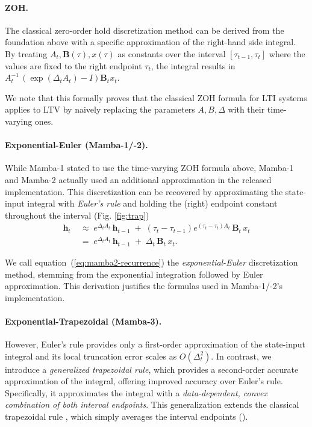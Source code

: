 \documentclass{article}
\newcommand{\citep}{\parencite}
\def\eqref#1{equation~(\ref{#1})}
\def\vh{{\bm{h}}}
\def\bB{{\bm{B}}}
\theoremstyle{plain}
\theoremstyle{definition}
\theoremstyle{remark}
\begin{document}
\paragraph{ZOH.}
The classical zero-order hold discretization method can be derived from the foundation above with a specific approximation of the right-hand side integral.
By treating $A_t, \bB(\tau), x(\tau)$ as constants over the interval $[\tau_{t-1}, \tau_t]$ where the values are fixed to the right endpoint $\tau_t$, the integral results in $A_t^{-1}\,\left(\exp(\Delta_tA_t) - I\right)\bB_tx_t$.

We note that this formally proves that the classical ZOH formula for LTI systems applies to LTV by naively replacing the parameters $A, B, \Delta$ with their time-varying ones.

\paragraph{Exponential-Euler (Mamba-1/-2).}
While Mamba-1 stated to use the time-varying ZOH formula above, Mamba-1 and Mamba-2 actually used an additional approximation in the released implementation.
This discretization can be recovered by approximating the state-input integral with \emph{Euler's rule} \citep{Süli_Mayers_2003} and holding the (right) endpoint constant throughout the interval (Fig. \ref{fig:trap})
\begin{align}
    \vh_t \;&\approx\; e^{\Delta_t A_t}\,\vh_{t-1} 
        \;+\; (\tau_t - \tau_{t-1}) e^{(\tau_t-\tau_t) A_t}\,\bB_t\,x_t \nonumber \\
    &=\; e^{\Delta_t A_t}\,\vh_{t-1} 
        \;+\; \Delta_t\,\bB_t\,x_t.
    \label{eq:mamba2-recurrence}
\end{align}

We call \eqref{eq:mamba2-recurrence}
the \emph{exponential-Euler} discretization method,
stemming from the exponential integration followed by Euler approximation.
This derivation justifies the formulas used in Mamba-1/-2's implementation.

\paragraph{Exponential-Trapezoidal (Mamba-3).}

However, Euler's rule provides only a first-order approximation of the state-input integral and its local truncation error scales as $O(\Delta_t^2)$.
In contrast, we introduce a \emph{generalized trapezoidal rule}, which provides a second-order accurate approximation of the integral, offering improved accuracy over Euler's rule.
Specifically, it approximates the integral with a \emph{data-dependent, convex combination of both interval endpoints}.
This generalization extends the classical trapezoidal rule \citep{Süli_Mayers_2003}, which simply averages the interval endpoints ().
\end{document}
